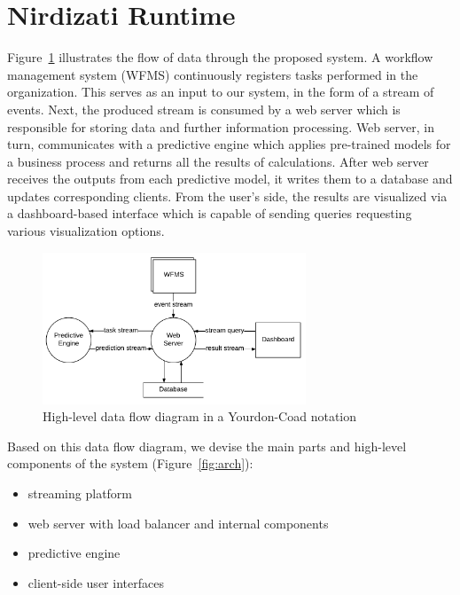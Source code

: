 \documentclass[runningheads,a4paper]{llncs}
\begin{document}
\section{Nirdizati Runtime} \label{sec:runtime}
Figure~\ref{fig:dfd_0} illustrates the flow of data through the proposed system. A workflow management system (WFMS) continuously registers tasks performed in the organization.
This serves as an input to our system, in the form of a stream of events.
Next, the produced stream is consumed by a web server which is responsible for storing data and further information processing. 
Web server, in turn, communicates with a predictive engine which applies pre-trained models for a business process and returns all the results of calculations.
After web server receives the outputs from each predictive model, it writes them to a database and updates corresponding clients.
From the user's side, the results are visualized via a dashboard-based interface which is capable of sending queries requesting various visualization options.

\begin{figure}
	\centering
	\includegraphics[width=0.7\textwidth]{img/dfd_0}
	\caption{High-level data flow diagram in a Yourdon-Coad notation}
	\label{fig:dfd_0}
\end{figure}

Based on this data flow diagram, we devise the main parts and high-level components of the system (Figure~\ref{fig:arch}): 

\begin{itemize}
	\setlength{\itemsep}{1pt}
	\setlength{\parskip}{0pt}
	\setlength{\parsep}{0pt}
	\item streaming platform
	\item web server with load balancer and internal components
	\item predictive engine
	\item client-side user interfaces
\end{itemize}
\end{document}
